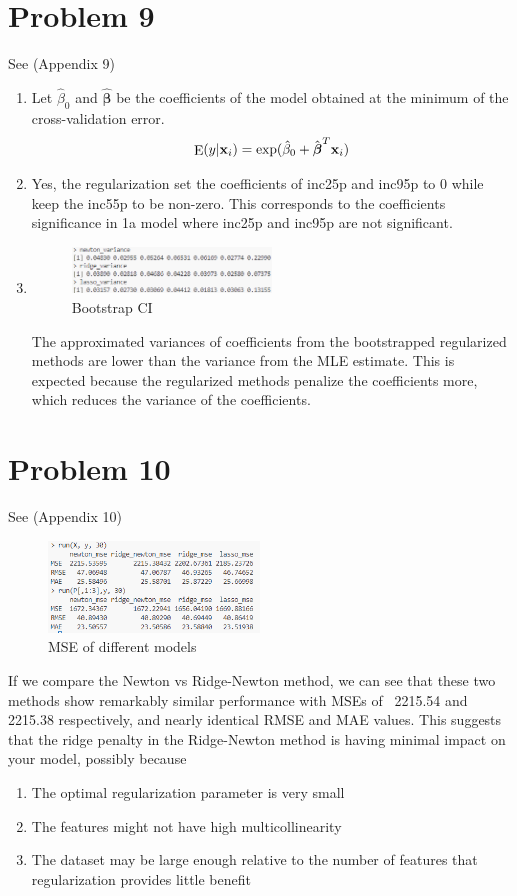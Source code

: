 \documentclass{article}
\newcommand{\vect}[1]{\boldsymbol{#1}}
\newcommand{\vectrm}[1]{\boldsymbol{\rm #1}}
\DeclareMathOperator{\E}{E}
\begin{document}
\section*{Problem 9}
See (Appendix 9)
\begin{enumerate}[label=(\alph*)]
  \item 
  Let \(\hat{\beta}_0\) and \(\hat{\vect{\beta}}\) be the coefficients of the model obtained at the minimum of the cross-validation error.
  \[
  \E(y| \vectrm{x}_i) = \exp(\hat{\beta}_0 + \hat{\vect{\beta}}^T \vectrm{x}_i)
  \]
  \item  Yes, the regularization set the coefficients of inc25p and inc95p to 0 while keep the inc55p to be non-zero. This corresponds to the coefficients significance in 1a model where inc25p and inc95p are not significant.
  \item
  \begin{figure}[h]
      \centering
      \includegraphics[width=0.5\textwidth]{q9c.png}
      \caption{Bootstrap CI}
  \end{figure}
  The approximated variances of coefficients from the bootstrapped regularized methods are lower than the variance from the MLE estimate. This is expected because the regularized methods penalize the coefficients more, which reduces the variance of the coefficients.
\end{enumerate}

\section*{Problem 10}
See (Appendix 10)
\begin{figure}[h]
    \centering
    \includegraphics[width=0.5\textwidth]{10.png}
    \caption{MSE of different models}
\end{figure}

If we compare the Newton vs Ridge-Newton method, we can see that these two methods show remarkably similar performance with MSEs of ~2215.54 and 2215.38 respectively, and nearly identical RMSE and MAE values. This suggests that the ridge penalty in the Ridge-Newton method is having minimal impact on your model, possibly because
\begin{enumerate}
    \item The optimal regularization parameter is very small
    \item The features might not have high multicollinearity
    \item The dataset may be large enough relative to the number of features that regularization provides little benefit
\end{enumerate}
\end{document}
